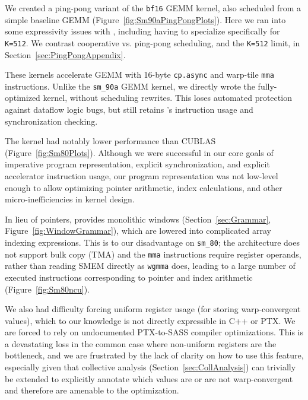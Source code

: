 We created a ping-pong variant of the \texttt{bf16} GEMM kernel,
also scheduled from a simple baseline GEMM (Figure~\ref{fig:Sm90aPingPongPlots}).
Here we ran into some expressivity issues with \sporkName{},
including having to specialize specifically for \texttt{K=512}.
We contrast cooperative vs. ping-pong scheduling, and the \texttt{K=512} limit, in Section~\ref{sec:PingPongAppendix}.



These kernels accelerate GEMM with 16-byte \texttt{cp.async} and warp-tile \texttt{mma} instructions.
Unlike the \texttt{sm\_90a} GEMM kernel,
we directly wrote the fully-optimized kernel, without scheduling rewrites.
This loses automated protection against dataflow logic bugs,
but still retains \sporkName{}'s instruction usage and synchronization checking.

The \sporkName{} kernel had notably lower performance than CUBLAS  (Figure~\ref{fig:Sm80Plots}).
Although we were successful in our core goals of imperative program representation,
explicit synchronization,
and explicit accelerator instruction usage,
our program representation was not low-level enough to allow optimizing
pointer arithmetic, index calculations, and other micro-inefficiencies in kernel design.

In lieu of pointers, \sporkName{} provides monolithic windows
(Section~\ref{sec:Grammar}, Figure~\ref{fig:WindowGrammar}),
which are lowered into complicated array indexing expressions.
This is to our disadvantage on \texttt{sm\_80};
the architecture does not support bulk copy (TMA)
and the \texttt{mma} instructions require register operands,
rather than reading SMEM directly as \texttt{wgmma} does,
leading to a large number of executed instructions
corresponding to pointer and index arithmetic (Figure~\ref{fig:Sm80ncu}).



We also had difficulty forcing uniform register usage (for storing warp-convergent values),
which to our knowledge is not directly expressible in C++ or PTX.
We are forced to rely on undocumented PTX-to-SASS compiler optimizations.
This is a devastating loss in the common case where non-uniform registers are the bottleneck,
and we are frustrated by the lack of clarity on how to use this feature,
especially given that collective analysis (Section~\ref{sec:CollAnalysis})
can trivially be extended to explicitly annotate which values are or are not warp-convergent
and therefore are amenable to the optimization.

